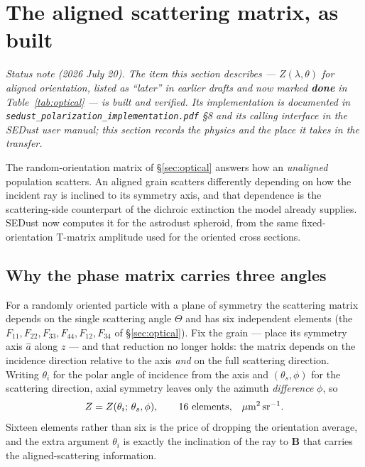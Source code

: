 \documentclass{my_memo}
\let\mathbf\boldsymbol
\newcommand{\code}[1]{\texttt{#1}}
\newcommand{\um}{\ensuremath{\,\mu\mathrm{m}}}
\begin{document}
\section{The aligned scattering matrix, as built}
\label{sec:alignedscat}

\emph{Status note (2026 July 20). The item this section describes ---
$Z(\lambda,\theta)$ for aligned orientation, listed as ``later'' in earlier
drafts and now marked \textbf{done} in Table~\ref{tab:optical} --- is built and
verified. Its implementation is documented in
\code{sedust\_polarization\_implementation.pdf} \S8 and its calling interface in
the SEDust user manual; this section records the physics and the place it takes
in the transfer.}

The random-orientation matrix of \S\ref{sec:optical} answers how an
\emph{unaligned} population scatters. An aligned grain scatters differently
depending on how the incident ray is inclined to its symmetry axis, and that
dependence is the scattering-side counterpart of the dichroic extinction the
model already supplies. SEDust now computes it for the astrodust spheroid, from
the same fixed-orientation T-matrix amplitude used for the oriented cross
sections.

\subsection{Why the phase matrix carries three angles}

For a randomly oriented particle with a plane of symmetry the scattering matrix
depends on the single scattering angle $\Theta$ and has six independent elements
(the $F_{11},F_{22},F_{33},F_{44},F_{12},F_{34}$ of \S\ref{sec:optical}). Fix the
grain --- place its symmetry axis $\hat a$ along $z$ --- and that reduction no
longer holds: the matrix depends on the incidence direction relative to the axis
\emph{and} on the full scattering direction. Writing $\theta_i$ for the polar
angle of incidence from the axis and $(\theta_s,\phi)$ for the scattering
direction, axial symmetry leaves only the azimuth \emph{difference} $\phi$, so
\begin{equation}
  Z = Z(\theta_i;\,\theta_s,\phi),\qquad 16\ \hbox{elements},\ \
  \um^2\,\mathrm{sr}^{-1}.
  \label{eq:Zangles}
\end{equation}
Sixteen elements rather than six is the price of dropping the orientation
average, and the extra argument $\theta_i$ is exactly the inclination of the ray
to $\mathbf{B}$ that carries the aligned-scattering information.
\end{document}
